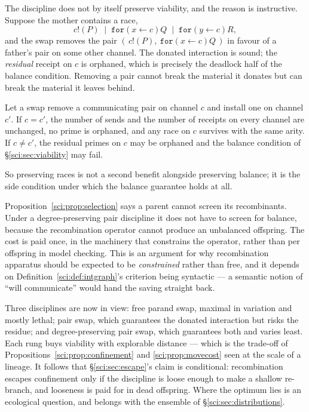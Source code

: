 The discipline does not by itself preserve viability, and the reason is instructive. Suppose the
mother contains a race,
\[
c!(P) \;\mid\; \texttt{for}(x \leftarrow c)Q \;\mid\; \texttt{for}(y \leftarrow c)R ,
\]
and the swap removes the pair $(\,c!(P),\ \texttt{for}(x \leftarrow c)Q\,)$ in favour of a father's
pair on some other channel. The donated interaction is sound; the \emph{residual} receipt on $c$ is
orphaned, which is precisely the deadlock half of the balance condition. Removing a pair cannot break
the material it donates but can break the material it leaves behind.

\begin{proposition}
\label{sci:prop:degree}
Let a swap remove a communicating pair on channel $c$ and install one on channel $c'$. If $c = c'$,
the number of sends and the number of receipts on every channel are unchanged, no prime is orphaned,
and any race on $c$ survives with the same arity. If $c \ne c'$, the residual primes on $c$ may be
orphaned and the balance condition of \S\ref{sci:sec:viability} may fail.
\end{proposition}

So preserving races is not a second benefit alongside preserving balance; it is the side condition
under which the balance guarantee holds at all.

\begin{remark}
\label{sci:rem:discipline}
Proposition~\ref{sci:prop:selection} says a parent cannot screen its recombinants. Under a
degree-preserving pair discipline it does not have to screen for balance, because the recombination
operator cannot produce an unbalanced offspring. The cost is paid once, in the machinery that
constrains the operator, rather than per offspring in model checking. This is an argument for why
recombination apparatus should be expected to be \emph{constrained} rather than free, and it depends
on Definition~\ref{sci:def:intgraph}'s criterion being syntactic --- a semantic notion of ``will
communicate'' would hand the saving straight back.
\end{remark}

\begin{remark}
\label{sci:rem:dial}
Three disciplines are now in view: free parand swap, maximal in variation and mostly lethal; pair
swap, which guarantees the donated interaction but risks the residue; and degree-preserving pair swap,
which guarantees both and varies least. Each rung buys viability with explorable distance --- which is
the trade-off of Propositions~\ref{sci:prop:confinement} and \ref{sci:prop:movecost} seen at the scale of a
lineage. It follows that \S\ref{sci:sec:escape}'s claim is conditional: recombination escapes confinement
only if the discipline is loose enough to make a shallow re-branch, and looseness is paid for in dead
offspring. Where the optimum lies is an ecological question, and belongs with the ensemble of
\S\ref{sci:sec:distributions}.
\end{remark}


